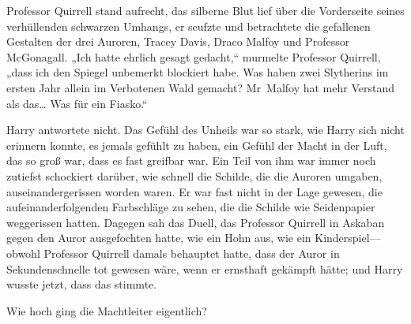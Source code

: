 Professor Quirrell stand aufrecht, das silberne Blut lief über die Vorderseite seines verhüllenden schwarzen Umhangs, er seufzte und betrachtete die gefallenen Gestalten der drei Auroren, Tracey Davis, Draco Malfoy und Professor McGonagall.
„Ich hatte ehrlich gesagt gedacht,“ murmelte Professor Quirrell, „dass ich den Spiegel unbemerkt blockiert habe. Was haben zwei Slytherins im ersten Jahr allein im Verbotenen Wald gemacht? Mr~Malfoy hat mehr Verstand als das… Was für ein Fiasko.“

Harry antwortete nicht. Das Gefühl des Unheils war so stark, wie Harry sich nicht erinnern konnte, es jemals gefühlt zu haben, ein Gefühl der Macht in der Luft, das so groß war, dass es fast greifbar war. Ein Teil von ihm war immer noch zutiefst schockiert darüber, wie schnell die Schilde, die die Auroren umgaben, auseinandergerissen worden waren. Er war fast nicht in der Lage gewesen, die aufeinanderfolgenden Farbschläge zu sehen, die die Schilde wie Seidenpapier weggerissen hatten. Dagegen sah das Duell, das Professor Quirrell in Askaban gegen den Auror ausgefochten hatte, wie ein Hohn aus, wie ein Kinderspiel—obwohl Professor Quirrell damals behauptet hatte, dass der Auror in Sekundenschnelle tot gewesen wäre, wenn er ernsthaft gekämpft hätte; und Harry wusste jetzt, dass das stimmte.

Wie hoch ging die Machtleiter eigentlich?

